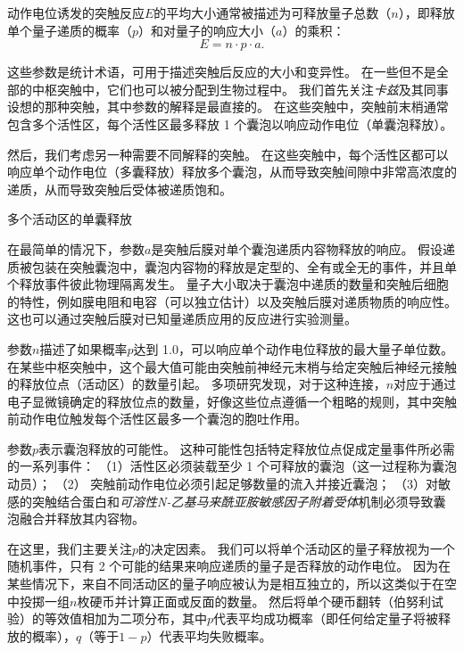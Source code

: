 \begin{proposition}[突触强度取决于递质释放的概率和其他量子参数] \label{box:15_1}
	
	\quad \quad 动作电位诱发的突触反应$E$的平均大小通常被描述为可释放量子总数（$n$），即释放单个量子递质的概率（$p$）和对量子的响应大小（$a$）的乘积：
	\begin{equation}\label{eq:15_quantum_response}
		E = n \cdot p \cdot a.
	\end{equation}
	
	\quad \quad 这些参数是统计术语，可用于描述突触后反应的大小和变异性。
	在一些但不是全部的中枢突触中，它们也可以被分配到生物过程中。
	我们首先关注\textit{卡兹}及其同事设想的那种突触，其中参数的解释是最直接的。
	在这些突触中，突触前末梢通常包含多个活性区，每个活性区最多释放 1 个囊泡以响应动作电位（单囊泡释放）。
	
	\quad \quad 然后，我们考虑另一种需要不同解释的突触。
	在这些突触中，每个活性区都可以响应单个动作电位（多囊释放）释放多个囊泡，从而导致突触间隙中非常高浓度的递质，从而导致突触后受体被递质饱和。
	
	\quad \quad 多个活动区的单囊释放
	
	\quad \quad 在最简单的情况下，参数$a$是突触后膜对单个囊泡递质内容物释放的响应。
	假设递质被包装在突触囊泡中，囊泡内容物的释放是定型的、全有或全无的事件，并且单个释放事件彼此物理隔离发生。
	量子大小取决于囊泡中递质的数量和突触后细胞的特性，例如膜电阻和电容（可以独立估计）以及突触后膜对递质物质的响应性。
	这也可以通过突触后膜对已知量递质应用的反应进行实验测量。
	
	\quad \quad 参数$ n $描述了如果概率$ p $达到 1.0，可以响应单个动作电位释放的最大量子单位数。
	在某些中枢突触中，这个最大值可能由突触前神经元末梢与给定突触后神经元接触的释放位点（活动区）的数量引起。
	多项研究发现，对于这种连接，$ n $对应于通过电子显微镜确定的释放位点的数量，好像这些位点遵循一个粗略的规则，其中突触前动作电位触发每个活性区最多一个囊泡的胞吐作用。
	
	\quad \quad 参数$ p $表示囊泡释放的可能性。
	这种可能性包括特定释放位点促成定量事件所必需的一系列事件：
	（1）活性区必须装载至少 1 个可释放的囊泡（这一过程称为囊泡动员）；
	（2） 突触前动作电位必须引起足够数量的流入并接近囊泡；
	（3）对敏感的突触结合蛋白和\textit{可溶性N-乙基马来酰亚胺敏感因子附着受体}机制必须导致囊泡融合并释放其内容物。
	
	\quad \quad 在这里，我们主要关注$ p $的决定因素。
	我们可以将单个活动区的量子释放视为一个随机事件，只有 2 个可能的结果来响应递质的量子是否释放的动作电位。
	因为在某些情况下，来自不同活动区的量子响应被认为是相互独立的，所以这类似于在空中投掷一组$n$枚硬币并计算正面或反面的数量。
	然后将单个硬币翻转（伯努利试验）的等效值相加为二项分布，其中$ p $代表平均成功概率（即任何给定量子将被释放的概率），$ q $（等于$ 1-p $）代表平均失败概率。
	

\end{proposition}
